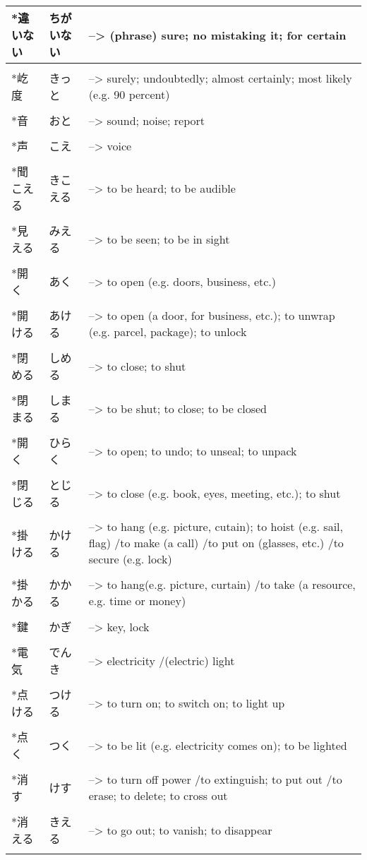 \documentclass{article}
\begin{document}
\begin{tabular}{ l | l p{13cm} }
*違いない&ちがいない&--> (phrase) sure; no mistaking it; for certain \\ \hline\\[-1em]
*屹度&きっと&--> surely; undoubtedly; almost certainly; most likely (e.g. 90 percent) \\ \hline\\[-1em]
*音&おと&--> sound; noise; report \\ \hline\\[-1em]
*声&こえ&--> voice \\ \hline\\[-1em]
*聞こえる&きこえる&--> to be heard; to be audible \\ \hline\\[-1em]
*見える&みえる&--> to be seen; to be in sight \\ \hline\\[-1em]
*開く&あく&--> to open (e.g. doors, business, etc.) \\ \hline\\[-1em]
*開ける&あける&--> to open (a door, for business, etc.); to unwrap (e.g. parcel, package); to unlock \\ \hline\\[-1em]
*閉める&しめる&--> to close; to shut \\ \hline\\[-1em]
*閉まる&しまる&--> to be shut; to close; to be closed \\ \hline\\[-1em]
*開く&ひらく&--> to open; to undo; to unseal; to unpack \\ \hline\\[-1em]
*閉じる&とじる&--> to close (e.g. book, eyes, meeting, etc.); to shut \\ \hline\\[-1em]
*掛ける&かける&--> to hang (e.g. picture, cutain); to hoist (e.g. sail, flag) /to make (a call) /to put on (glasses, etc.) /to secure (e.g. lock) \\ \hline\\[-1em]
*掛かる&かかる&--> to hang(e.g. picture, curtain) /to take (a resource, e.g. time or money) \\ \hline\\[-1em]
*鍵&かぎ&--> key, lock \\ \hline\\[-1em]
*電気&でんき&--> electricity /(electric) light \\ \hline\\[-1em]
*点ける&つける&--> to turn on; to switch on; to light up \\ \hline\\[-1em]
*点く&つく&--> to be lit (e.g. electricity comes on); to be lighted \\ \hline\\[-1em]
*消す&けす&--> to turn off power /to extinguish; to put out /to erase; to delete; to cross out \\ \hline\\[-1em]
*消える&きえる&--> to go out; to vanish; to disappear \\ \hline\\[-1em]

\end{tabular}
\end{document}
